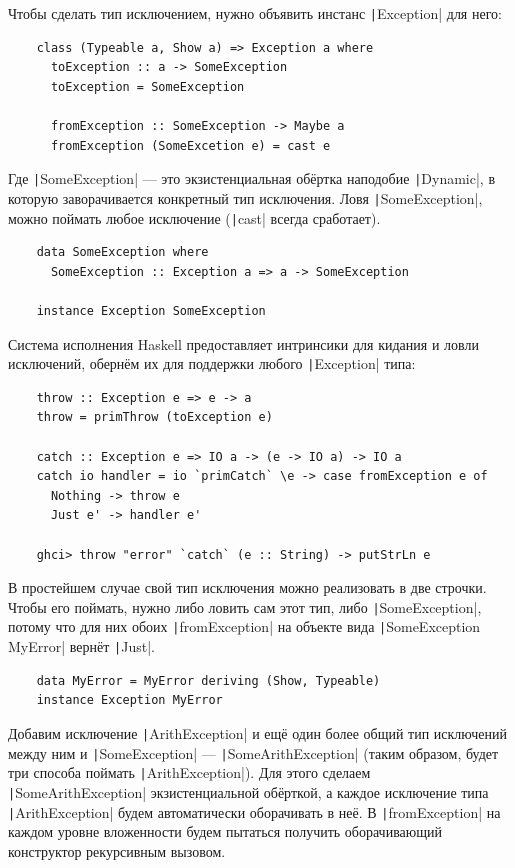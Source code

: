 Чтобы сделать тип исключением, нужно объявить инстанс \texttt|Exception| для него:
\begin{verbatim}
    class (Typeable a, Show a) => Exception a where
      toException :: a -> SomeException
      toException = SomeException

      fromException :: SomeException -> Maybe a
      fromException (SomeExcetion e) = cast e
\end{verbatim}
Где \texttt|SomeException| --- это экзистенциальная обёртка наподобие \texttt|Dynamic|, в которую заворачивается конкретный тип исключения.
Ловя \texttt|SomeException|, можно поймать любое исключение (\texttt|cast| всегда сработает).
\begin{verbatim}
    data SomeException where
      SomeException :: Exception a => a -> SomeException

    instance Exception SomeException
\end{verbatim}

Система исполнения Haskell предоставляет интринсики для кидания и ловли исключений, обернём их для поддержки любого \texttt|Exception| типа:
\begin{verbatim}
    throw :: Exception e => e -> a
    throw = primThrow (toException e)

    catch :: Exception e => IO a -> (e -> IO a) -> IO a
    catch io handler = io `primCatch` \e -> case fromException e of
      Nothing -> throw e
      Just e' -> handler e'

    ghci> throw "error" `catch` (e :: String) -> putStrLn e
\end{verbatim}

В простейшем случае свой тип исключения можно реализовать в две строчки.
Чтобы его поймать, нужно либо ловить сам этот тип, либо \texttt|SomeException|, потому что для них обоих \texttt|fromException| на объекте вида \texttt|SomeException MyError| вернёт \texttt|Just|.
\begin{verbatim}
    data MyError = MyError deriving (Show, Typeable)
    instance Exception MyError
\end{verbatim}

Добавим исключение \texttt|ArithException| и ещё один более общий тип исключений между ним и \texttt|SomeException| --- \texttt|SomeArithException| (таким образом, будет три способа поймать \texttt|ArithException|).
Для этого сделаем \texttt|SomeArithException| экзистенциальной обёрткой, а каждое исключение типа \texttt|ArithException| будем автоматически оборачивать в неё.
В \texttt|fromException| на каждом уровне вложенности будем пытаться получить оборачивающий конструктор рекурсивным вызовом.

